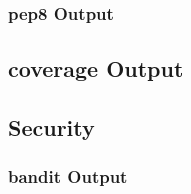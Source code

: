 	\subsubsection*{pep8 Output}
	

	\subsection*{coverage Output}
	
	
	\subsection*{Security}
	\subsubsection*{bandit Output}
	